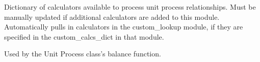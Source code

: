 \documentclass[a4paper,10pt,english]{sphinxmanual}
\begin{document}
\begin{fulllineitems}
\label{\detokenize{calculators:calculators.calcs_dict}}
Dictionary of calculators available to process unit process relationships.
Must be manually updated if additional calculators are added to this module.
Automatically pulls in calculators in the custom\_lookup module, if they are
specified in the custom\_calcs\_dict in that module.

Used by the Unit Process class’s balance function.

\end{fulllineitems}

\end{document}
